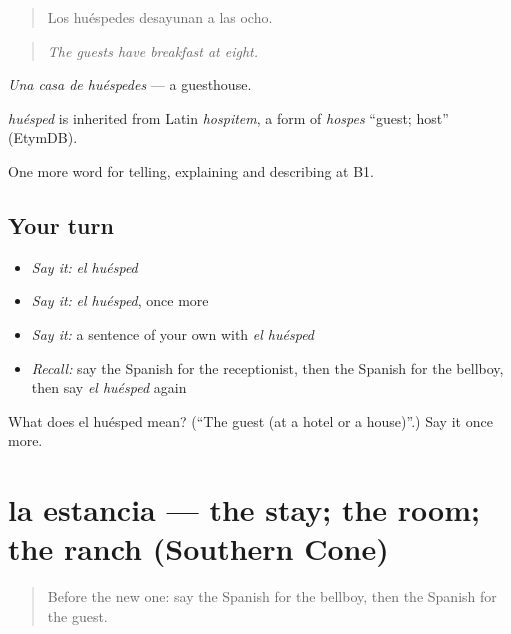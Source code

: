 \begin{quote}
Los huéspedes desayunan a las ocho.
\end{quote}

\begin{quote}
\emph{The guests have breakfast at eight.}
\end{quote}

\emph{Una casa de huéspedes} — a guesthouse.

\begin{cousinweb}
\emph{huésped} is inherited from Latin \emph{hospitem}, a form of \emph{hospes} \textquotedblleft{}guest; host\textquotedblright{} (EtymDB).
\end{cousinweb}

\begin{grammarlens}[title={What you've built}]
One more word for telling, explaining and describing at B1.
\end{grammarlens}

\subsection*{Your turn}
\begin{itemize}
\raggedright
  \item \emph{Say it:} \emph{el huésped}
  \item \emph{Say it:} \emph{el huésped}, once more
  \item \emph{Say it:} a sentence of your own with \emph{el huésped}
  \item \emph{Recall:} say the Spanish for the receptionist, then the Spanish for the bellboy, then say \emph{el huésped} again
\end{itemize}

\begin{tcolorbox}[breakable,colback=teal!4,colframe=teal!35!black,title={Before you move on}]
What does el huésped mean? (\textquotedblleft{}The guest (at a hotel or a house)\textquotedblright{}.) Say it once more.
\end{tcolorbox}
\section[la estancia]{la estancia — the stay; the room; the ranch (Southern Cone)}

\label{lesson:ES-C661-estancia}



\begin{quote}
Before the new one: say the Spanish for the bellboy, then the Spanish for the guest.
\end{quote}

